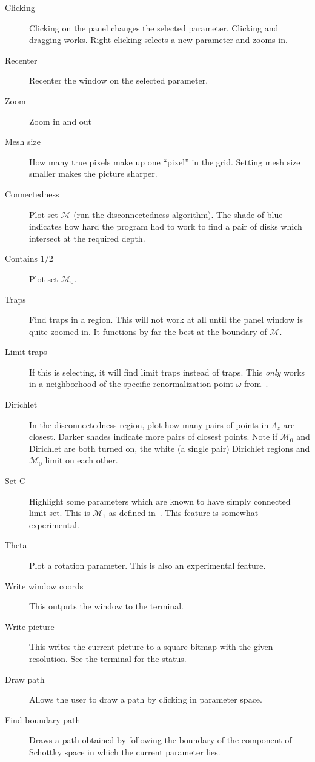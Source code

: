 \documentclass{amsart}
\begin{document}
\begin{description}
\item[Clicking] Clicking on the panel changes the selected parameter.  
Clicking and dragging works.  Right clicking selects a new parameter and zooms in.
\item[Recenter] Recenter the window on the selected parameter.
\item[Zoom] Zoom in and out
\item[Mesh size] How many true pixels make up one ``pixel'' in the grid.  
Setting mesh size smaller makes the picture sharper.
\item[Connectedness] Plot set $\mathcal{M}$ (run the disconnectedness algorithm).
The shade of blue indicates how hard the program had to work to find a pair of 
disks which intersect at the required depth.
\item[Contains $1/2$] Plot set $\mathcal{M}_0$.
\item[Traps] Find traps in a region.  This will not work at all until the 
panel window is quite zoomed in.  It functions by far the best at the boundary of $\mathcal{M}$.
\item[Limit traps]  If this is selecting, it will find limit traps instead of traps.
This \emph{only} works in a neighborhood of the specific renormalization point $\omega$ 
from~\cite{paper}.
\item[Dirichlet] In the disconnectedness region, plot how many pairs of points in $\Lambda_z$ 
are closest.  Darker shades indicate more pairs of closest points.  Note if $\mathcal{M}_0$ 
and Dirichlet are both turned on, the white (a single pair) Dirichlet regions and 
$\mathcal{M}_0$ limit on each other.
\item[Set C] Highlight some parameters which are known to have simply connected limit set.
This is $\mathcal{M}_1$ as defined in~\cite{paper}.  This feature is somewhat 
experimental.
\item[Theta] Plot a rotation parameter.  This is also an experimental feature.
\item[Write window coords] This outputs the window to the terminal.
\item[Write picture]  This writes the current picture to a square bitmap with 
the given resolution.  See the terminal for the status.
\item[Draw path] Allows the user to draw a path by clicking in parameter space.
\item[Find boundary path] Draws a path obtained by following the boundary of 
the component of Schottky space in which the current parameter lies.  

\end{description}
\end{document}
